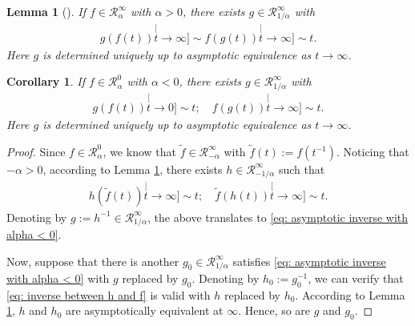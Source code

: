 \documentclass[12pt,a4paper]{amsart}
\newtheorem{lem}[thm]{Lemma}
\newtheorem{cro}[thm]{Corollary}
\theoremstyle{definition}
\numberwithin{equation}{section}
\begin{document}
\begin{lem}[{\cite[Theorem 1.5.12]{BinghamGoldieTeugels1989Regular}}] \label{lem: regularly variation and inverse}
	If $f \in \mathcal R_\alpha^\infty$ with $\alpha > 0$, there exists $g \in \mathcal R^\infty_{1/\alpha}$ with
  \begin{align}
    g(f(t))
    \stackrel[t\to \infty]{}{\sim}
    f(g(t))
    \stackrel[t\to \infty]{}{\sim}
    t.
  \end{align}
	Here $g$ is determined uniquely up to asymptotic equivalence as $t\to \infty$.
\end{lem}
\begin{cro} \label{cro: regularly varing and inverse with alpha < 0}
	If $f \in \mathcal R_\alpha^0$ with $\alpha < 0$, there exists $g \in \mathcal R^\infty_{1/\alpha}$ with
  \begin{align} \label{eq: asymptotic inverse with alpha < 0}
    g(f(t))
    \stackrel[t\to 0]{}{\sim}
    t;
    \quad
    f(g(t))
    \stackrel[t\to \infty]{}{\sim}
    t.
  \end{align}
	Here $g$ is determined uniquely up to asymptotic equivalence as $t\to \infty$.
\end{cro}
\begin{proof}
	Since $f \in \mathcal R_\alpha^0$, we know that $\widetilde f \in \mathcal R_{-\alpha}^\infty$ with $\widetilde f(t):= f(t^{-1})$.
	Noticing that $-\alpha > 0$, according to Lemma \ref{lem: regularly variation and inverse}, there exists $h \in \mathcal R_{-1/\alpha}^{\infty}$ such that
  \begin{align} \label{eq: inverse between h and f}
    h(\widetilde f(t))
    \stackrel[t\to \infty]{}{\sim}
    t;
    \quad
    \widetilde f(h(t))
    \stackrel[t\to \infty]{}{\sim}
    t.
  \end{align}
	Denoting by $g := h^{-1} \in \mathcal R_{1/\alpha}^\infty$, the above translates to \eqref{eq: asymptotic inverse with alpha < 0}.

	Now, suppose that there is another $g_0 \in \mathcal R_{1/\alpha}^\infty$ satisfies \eqref{eq: asymptotic inverse with alpha < 0} with $g$ replaced by $g_0$.
	Denoting by $h_0 := g_0^{-1}$, we can verify that \eqref{eq: inverse between h and f} is valid with $h$ replaced by $h_0$.
	According to Lemma \ref{lem: regularly variation and inverse}, $h$ and $h_0$ are asymptotically equivalent at $\infty$.
	Hence, so are $g$ and $g_0$.
\end{proof}
\end{document}
